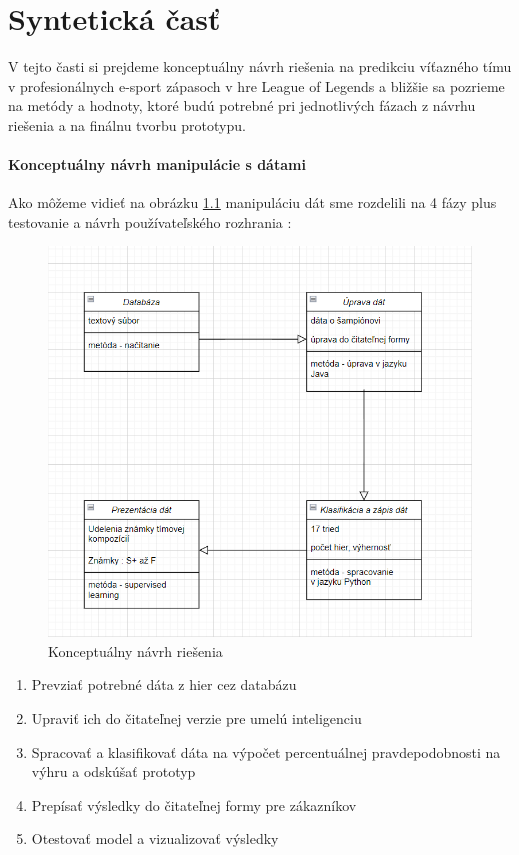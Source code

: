 
\chapter{Syntetická časť}
\label{methodology}
V tejto časti si prejdeme konceptuálny návrh riešenia na predikciu víťazného tímu v profesionálnych e-sport zápasoch v hre League of Legends a bližšie sa pozrieme na metódy a hodnoty, ktoré budú potrebné pri jednotlivých fázach z návrhu riešenia a na finálnu tvorbu prototypu. 
\subsubsection{Konceptuálny návrh manipulácie s dátami}
Ako môžeme vidieť na obrázku \ref{koncept} manipuláciu dát sme rozdelili na 4 fázy plus testovanie a návrh používateľského rozhrania : 
 \begin{figure}[h!]
	
	\includegraphics[width=.9\textwidth]{figures/koncept}
	\centering
	\caption{ Konceptuálny návrh riešenia \label{koncept}}
	
\end{figure}



\begin{enumerate}
	\item Prevziať potrebné dáta z hier cez databázu
	\item Upraviť ich do čitateľnej verzie pre umelú inteligenciu
	\item Spracovať a klasifikovať dáta na výpočet percentuálnej pravdepodobnosti na výhru a odskúšať prototyp
	\item Prepísať výsledky do čitateľnej formy pre zákazníkov
	\item Otestovať model a vizualizovať výsledky
\end{enumerate}

